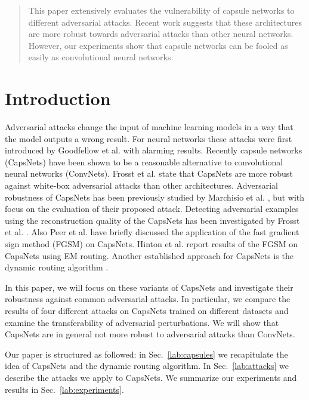 \documentclass{article}
\begin{document}
\printAffiliationsAndNotice{\icmlEqualContribution} %

\begin{abstract}
	This paper extensively evaluates the vulnerability of capsule networks to different adversarial attacks. Recent work suggests that these architectures are more robust towards adversarial attacks than other neural networks. However, our experiments show that capsule networks can be fooled as easily as convolutional neural networks.
\end{abstract}

\section{Introduction}
Adversarial attacks change the input of machine learning models in a
way that the model outputs a wrong result. For neural networks these
attacks were first introduced by Goodfellow et al.  with
alarming results. Recently capsule networks (CapsNets) \cite{capsules}
have been shown to be a reasonable alternative to convolutional neural
networks (ConvNets). Frosst et al.  state that CapsNets
are more robust against white-box adversarial attacks than other
architectures. Adversarial robustness of CapsNets has been previously
studied by Marchisio et al. , but with focus on the
evaluation of their proposed attack. Detecting adversarial examples
using the reconstruction quality of the CapsNets has been investigated
by Frosst et al. . Also Peer et al. 
have briefly discussed the application of the fast gradient sign
method (FGSM) \cite{fgsm} on CapsNets. Hinton et al. 
report results of the FGSM on CapsNets using EM routing.  Another
established approach for CapsNets is the dynamic routing algorithm
\cite{capsules}.

In this paper, we will focus on these variants of CapsNets and
investigate their robustness against common adversarial attacks.  In
particular, we compare the results of four different attacks on
CapsNets trained on different datasets and examine the transferability
of adversarial perturbations. We will show that CapsNets are in
general not more robust to adversarial attacks than ConvNets.

Our paper is structured as followed: in Sec.~\ref{lab:capsules} we
recapitulate the idea of CapsNets and the dynamic routing algorithm. In Sec.~\ref{lab:attacks} we describe the attacks
we apply to CapsNets. We summarize our experiments and results in  Sec.~\ref{lab:experiments}.
\end{document}
